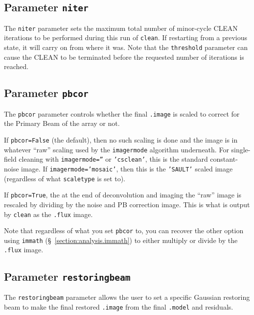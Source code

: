 \subsection{Parameter {\tt niter} }
\label{section:im.clean.niter}

The {\tt niter} parameter sets the maximum total number of minor-cycle CLEAN
iterations to be performed during this run of {\tt clean}.  If restarting
from a previous state, it will carry on from where it was.  Note that
the {\tt threshold} parameter can cause the CLEAN to be terminated before
the requested number of iterations is reached.

\subsection{Parameter {\tt pbcor} }
\label{section:im.clean.pbcor}

The {\tt pbcor} parameter controls whether the final {\tt .image} 
is scaled to correct for the Primary Beam of the array or not.

If {\tt pbcor=False} (the default), then no such scaling is done
and the image is in whatever ``raw'' scaling used by the 
{\tt imagermode} algorithm underneath.  For single-field cleaning
with {\tt imagermode=''} or {\tt 'csclean'}, this is the standard
constant-noise image.  If {\tt imagermode='mosaic'}, then this is
the {\tt 'SAULT'} scaled image (regardless of what {\tt scaletype}
is set to).

If {\tt pbcor=True}, the at the end of deconvolution and imaging the
``raw'' image is rescaled by dividing by the noise and PB correction
image.  This is what is output by {\tt clean} as the {\tt .flux}
image.  

Note that regardless of what you set {\tt pbcor} to, you can recover
the other option using {\tt immath} (\S~\ref{section:analysis.immath})
to either multiply or divide by the {\tt .flux} image.

\subsection{Parameter {\tt restoringbeam} }
\label{section:im.clean.restoringbeam}

The {\tt restoringbeam} parameter allows the user to set a specific
Gaussian restoring beam to make the final restored {\tt .image} from
the final {\tt .model} and residuals.

